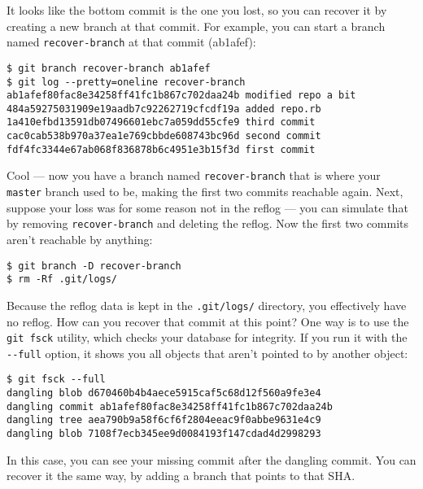 \documentclass[a4paper]{book}
\newcounter{tab}[chapter]
\begin{document}
It looks like the bottom commit is the one you lost, so you can recover it by creating a new branch at that commit. For example, you can start a branch named \texttt{recover-branch} at that commit (ab1afef):

\begin{shaded}\begin{verbatim}
$ git branch recover-branch ab1afef
$ git log --pretty=oneline recover-branch
ab1afef80fac8e34258ff41fc1b867c702daa24b modified repo a bit
484a59275031909e19aadb7c92262719cfcdf19a added repo.rb
1a410efbd13591db07496601ebc7a059dd55cfe9 third commit
cac0cab538b970a37ea1e769cbbde608743bc96d second commit
fdf4fc3344e67ab068f836878b6c4951e3b15f3d first commit
\end{verbatim}\end{shaded}

Cool --- now you have a branch named \texttt{recover-branch} that is where your \texttt{master} branch used to be, making the first two commits reachable again. Next, suppose your loss was for some reason not in the reflog --- you can simulate that by removing \texttt{recover-branch} and deleting the reflog. Now the first two commits aren't reachable by anything:

\begin{shaded}\begin{verbatim}
$ git branch -D recover-branch
$ rm -Rf .git/logs/
\end{verbatim}\end{shaded}

Because the reflog data is kept in the \texttt{.git/logs/} directory, you effectively have no reflog. How can you recover that commit at this point? One way is to use the \texttt{git fsck} utility, which checks your database for integrity. If you run it with the \texttt{-{}-full} option, it shows you all objects that aren't pointed to by another object:

\begin{shaded}\begin{verbatim}
$ git fsck --full
dangling blob d670460b4b4aece5915caf5c68d12f560a9fe3e4
dangling commit ab1afef80fac8e34258ff41fc1b867c702daa24b
dangling tree aea790b9a58f6cf6f2804eeac9f0abbe9631e4c9
dangling blob 7108f7ecb345ee9d0084193f147cdad4d2998293
\end{verbatim}\end{shaded}

In this case, you can see your missing commit after the dangling commit. You can recover it the same way, by adding a branch that points to that SHA.
\end{document}
